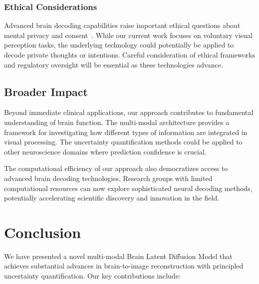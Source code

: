 \subsubsection{Ethical Considerations}

Advanced brain decoding capabilities raise important ethical questions about mental privacy and consent~\cite{ienca2017towards}. While our current work focuses on voluntary visual perception tasks, the underlying technology could potentially be applied to decode private thoughts or intentions. Careful consideration of ethical frameworks and regulatory oversight will be essential as these technologies advance.

\subsection{Broader Impact}

Beyond immediate clinical applications, our approach contributes to fundamental understanding of brain function. The multi-modal architecture provides a framework for investigating how different types of information are integrated in visual processing. The uncertainty quantification methods could be applied to other neuroscience domains where prediction confidence is crucial.

The computational efficiency of our approach also democratizes access to advanced brain decoding technologies. Research groups with limited computational resources can now explore sophisticated neural decoding methods, potentially accelerating scientific discovery and innovation in the field.

\section{Conclusion}
\label{sec:conclusion}

We have presented a novel multi-modal Brain Latent Diffusion Model that achieves substantial advances in brain-to-image reconstruction with principled uncertainty quantification. Our key contributions include:

